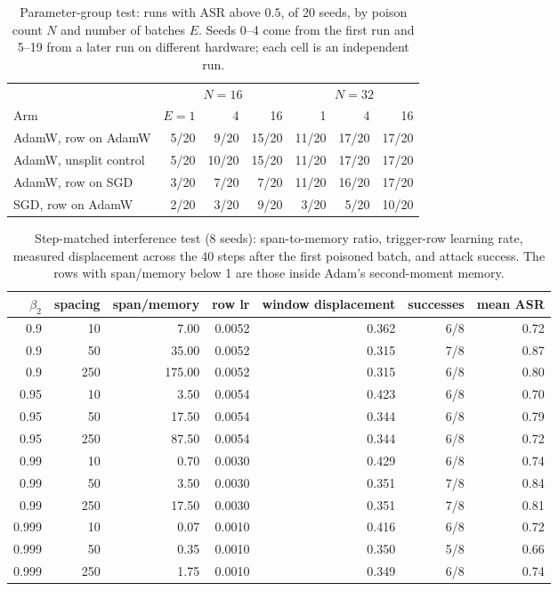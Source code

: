 \documentclass{article} %
\begin{document}
\begin{table}[ht]
\caption{Parameter-group test: runs with ASR above $0.5$, of 20 seeds, by poison count $N$ and number of batches $E$. Seeds 0--4 come from the first run and 5--19 from a later run on different hardware; each cell is an independent run.}
\label{tab:pgroups}
\centering
\small
\begin{tabular}{lrrrrrr}
\toprule
 & \multicolumn{3}{c}{$N=16$} & \multicolumn{3}{c}{$N=32$} \\
\cmidrule(lr){2-4}\cmidrule(lr){5-7}
Arm & $E{=}1$ & 4 & 16 & 1 & 4 & 16 \\
\midrule
AdamW, row on AdamW & 5/20 & 9/20 & 15/20 & 11/20 & 17/20 & 17/20 \\
AdamW, unsplit control & 5/20 & 10/20 & 15/20 & 11/20 & 17/20 & 17/20 \\
AdamW, row on SGD & 3/20 & 7/20 & 7/20 & 11/20 & 16/20 & 17/20 \\
SGD, row on AdamW & 2/20 & 3/20 & 9/20 & 3/20 & 5/20 & 10/20 \\
\bottomrule
\end{tabular}
\end{table}

\begin{table}[ht]
\caption{Step-matched interference test (8 seeds): span-to-memory ratio, trigger-row learning rate, measured displacement across the 40 steps after the first poisoned batch, and attack success. The rows with span/memory below 1 are those inside Adam's second-moment memory.}
\label{tab:int2}
\centering
\small
\begin{tabular}{rrrrrrr}
\toprule
$\beta_2$ & spacing & span/memory & row lr & window displacement & successes & mean ASR \\
\midrule
0.9 & 10 & 7.00 & 0.0052 & 0.362 & 6/8 & 0.72 \\
0.9 & 50 & 35.00 & 0.0052 & 0.315 & 7/8 & 0.87 \\
0.9 & 250 & 175.00 & 0.0052 & 0.315 & 6/8 & 0.80 \\
0.95 & 10 & 3.50 & 0.0054 & 0.423 & 6/8 & 0.70 \\
0.95 & 50 & 17.50 & 0.0054 & 0.344 & 6/8 & 0.79 \\
0.95 & 250 & 87.50 & 0.0054 & 0.344 & 6/8 & 0.72 \\
0.99 & 10 & 0.70 & 0.0030 & 0.429 & 6/8 & 0.74 \\
0.99 & 50 & 3.50 & 0.0030 & 0.351 & 7/8 & 0.84 \\
0.99 & 250 & 17.50 & 0.0030 & 0.351 & 7/8 & 0.81 \\
0.999 & 10 & 0.07 & 0.0010 & 0.416 & 6/8 & 0.72 \\
0.999 & 50 & 0.35 & 0.0010 & 0.350 & 5/8 & 0.66 \\
0.999 & 250 & 1.75 & 0.0010 & 0.349 & 6/8 & 0.74 \\
\bottomrule
\end{tabular}
\end{table}
\end{document}
